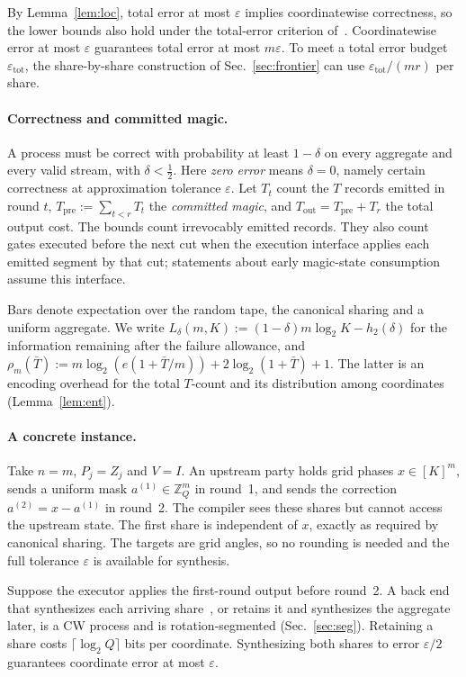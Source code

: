 \documentclass[aps,prx,twocolumn,superscriptaddress,nofootinbib,longbibliography]{revtex4-2}
\theoremstyle{plain}
\theoremstyle{definition}
\theoremstyle{remark}
\newcommand{\Tpre}{T_{\mathrm{pre}}}
\newcommand{\Tout}{T_{\mathrm{out}}}
\newcommand{\Z}{\mathbb{Z}}
\begin{document}
By Lemma~\ref{lem:loc}, total error at most $\varepsilon$ implies coordinatewise correctness, so the lower bounds also hold under the total-error criterion of~\cite{Paper1}. Coordinatewise error at most $\varepsilon$ guarantees total error at most $m\varepsilon$. To meet a total error budget $\varepsilon_{\mathrm{tot}}$, the share-by-share construction of Sec.~\ref{sec:frontier} can use $\varepsilon_{\mathrm{tot}}/(mr)$ per share.

\paragraph{Correctness and committed magic.} A process must be correct with probability at least $1-\delta$ on every aggregate and every valid stream, with $\delta<\tfrac12$. Here \emph{zero error} means $\delta=0$, namely certain correctness at approximation tolerance $\varepsilon$. Let $T_t$ count the $T$ records emitted in round $t$, $\Tpre:=\sum_{t<r}T_t$ the \emph{committed magic}, and $\Tout=\Tpre+T_r$ the total output cost. The bounds count irrevocably emitted records. They also count gates executed before the next cut when the execution interface applies each emitted segment by that cut; statements about early magic-state consumption assume this interface.

Bars denote expectation over the random tape, the canonical sharing and a uniform aggregate. We write $L_\delta(m,K):=(1-\delta)m\log_2K-h_2(\delta)$ for the information remaining after the failure allowance, and $\rho_m(\bar T):=m\log_2(e(1+\bar T/m))+\allowbreak2\log_2(1+\bar T)+1$. The latter is an encoding overhead for the total $T$-count and its distribution among coordinates (Lemma~\ref{lem:ent}).

\paragraph{A concrete instance.} Take $n=m$, $P_j=Z_j$ and $V=I$. An upstream party holds grid phases $x\in[K]^m$, sends a uniform mask $a^{(1)}\in\Z_Q^m$ in round~1, and sends the correction $a^{(2)}=x-a^{(1)}$ in round~2. The compiler sees these shares but cannot access the upstream state. The first share is independent of $x$, exactly as required by canonical sharing. The targets are grid angles, so no rounding is needed and the full tolerance $\varepsilon$ is available for synthesis.

Suppose the executor applies the first-round output before round~2. A back end that synthesizes each arriving share~\cite{RossSelinger}, or retains it and synthesizes the aggregate later, is a CW process and is rotation-segmented (Sec.~\ref{sec:seg}). Retaining a share costs $\lceil\log_2Q\rceil$ bits per coordinate. Synthesizing both shares to error $\varepsilon/2$ guarantees coordinate error at most $\varepsilon$.
\end{document}
